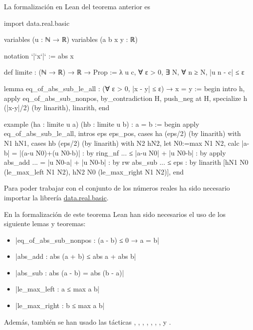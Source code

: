 La formalización en Lean del teorema anterior es
\begin{leancode}
import data.real.basic

variables (u : ℕ → ℝ)
variables (a b x y : ℝ)

notation `|`x`|` := abs x

def limite : (ℕ → ℝ) → ℝ → Prop :=
λ u c, ∀ ε > 0, ∃ N, ∀ n ≥ N, |u n - c| ≤ ε

lemma eq_of_abs_sub_le_all
  : (∀ ε > 0, |x - y| ≤ ε) → x = y :=
begin
  intro h,
  apply eq_of_abs_sub_nonpos,
  by_contradiction H,
  push_neg at H,
  specialize h (|x-y|/2) (by linarith),
  linarith,
end

example
  (ha : limite u a)
  (hb : limite u b)
  : a = b :=
begin
  apply eq_of_abs_sub_le_all,
  intros eps eps_pos,
  cases ha (eps/2) (by linarith) with N1 hN1,
  cases hb (eps/2) (by linarith) with N2 hN2,
  let N0:=max N1 N2,
  calc  |a-b|
      = |(a-u N0)+(u N0-b)| : by ring_nf
  ... ≤ |a-u N0| + |u N0-b| : by apply abs_add
  ... = |u N0-a| + |u N0-b| : by rw abs_sub
  ... ≤ eps                 : by linarith [hN1 N0 (le_max_left N1 N2),
                                           hN2 N0 (le_max_right N1 N2)],
end
\end{leancode}

Para poder trabajar con el conjunto de los números reales ha sido necesario
importar la librería \href{https://github.com/leanprover-community/mathlib/blob/master/src/data/real/basic.lean}
{data.real.basic}.

En la formalización de este teorema Lean han sido necesarios el uso
de los siguiente lemas y teoremas:
\begin{itemize}
\item {}|eq_of_abs_sub_nonpos : (a - b) ≤ 0 → a = b|
\item {}|abs_add : abs (a + b) ≤ abs a + abs b|
\item {}|abs_sub : abs (a - b) = abs (b - a)|
\item {}|le_max_left : a ≤ max a b|
\item {}|le_max_right : b ≤ max a b|
\end{itemize}

Además, también se han usado las tácticas
,
,
,
,
,
,
,
 y
.

